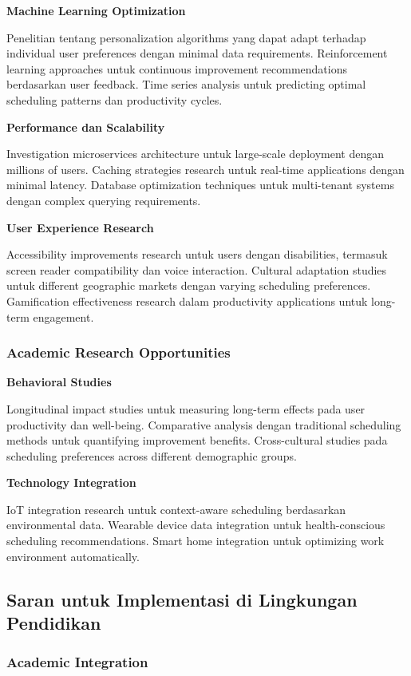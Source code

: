 \textbf{Machine Learning Optimization}

Penelitian tentang personalization algorithms yang dapat adapt terhadap individual user preferences dengan minimal data requirements. Reinforcement learning approaches untuk continuous improvement recommendations berdasarkan user feedback. Time series analysis untuk predicting optimal scheduling patterns dan productivity cycles.

\textbf{Performance dan Scalability}

Investigation microservices architecture untuk large-scale deployment dengan millions of users. Caching strategies research untuk real-time applications dengan minimal latency. Database optimization techniques untuk multi-tenant systems dengan complex querying requirements.

\textbf{User Experience Research}

Accessibility improvements research untuk users dengan disabilities, termasuk screen reader compatibility dan voice interaction. Cultural adaptation studies untuk different geographic markets dengan varying scheduling preferences. Gamification effectiveness research dalam productivity applications untuk long-term engagement.

\subsubsection{Academic Research Opportunities}

\textbf{Behavioral Studies}

Longitudinal impact studies untuk measuring long-term effects pada user productivity dan well-being. Comparative analysis dengan traditional scheduling methods untuk quantifying improvement benefits. Cross-cultural studies pada scheduling preferences across different demographic groups.

\textbf{Technology Integration}

IoT integration research untuk context-aware scheduling berdasarkan environmental data. Wearable device data integration untuk health-conscious scheduling recommendations. Smart home integration untuk optimizing work environment automatically.

\subsection{Saran untuk Implementasi di Lingkungan Pendidikan}

\subsubsection{Academic Integration}

